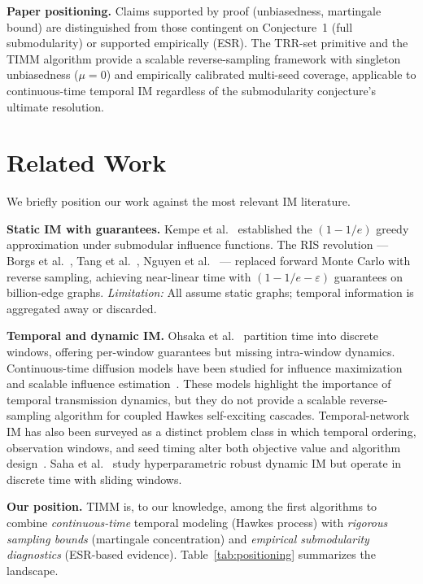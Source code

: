 \documentclass[10pt,conference]{IEEEtran}
\newcommand{\tiimm}{TIMM\xspace}
\begin{document}
\textbf{Paper positioning.}
Claims supported by proof (unbiasedness, martingale bound) are distinguished from those contingent on Conjecture~1 (full submodularity) or supported empirically (ESR).
The TRR-set primitive and the \tiimm{} algorithm provide a scalable reverse-sampling framework with singleton unbiasedness ($\mu{=}0$) and empirically calibrated multi-seed coverage, applicable to continuous-time temporal IM regardless of the submodularity conjecture's ultimate resolution.

\section{Related Work}

We briefly position our work against the most relevant IM literature.

\textbf{Static IM with guarantees.}
Kempe et al.~\cite{kempe2003} established the $(1-1/e)$ greedy approximation under submodular influence functions.
The RIS revolution — Borgs et al.~\cite{borgs2014}, Tang et al.~\cite{tang2014,tang2015}, Nguyen et al.~\cite{nguyen2016} — replaced forward Monte Carlo with reverse sampling, achieving near-linear time with $(1-1/e-\varepsilon)$ guarantees on billion-edge graphs.
\textit{Limitation:} All assume static graphs; temporal information is aggregated away or discarded.

\textbf{Temporal and dynamic IM.}
Ohsaka et al.~\cite{ohsaka2016} partition time into discrete windows, offering per-window guarantees but missing intra-window dynamics.
Continuous-time diffusion models have been studied for influence maximization and scalable influence estimation~\cite{gomez2012,du2013}.
These models highlight the importance of temporal transmission dynamics, but they do not provide a scalable reverse-sampling algorithm for coupled Hawkes self-exciting cascades.
Temporal-network IM has also been surveyed as a distinct problem class in which temporal ordering, observation windows, and seed timing alter both objective value and algorithm design~\cite{yanchenko2024}.
Saha et al.~\cite{saha2025} study hyperparametric robust dynamic IM but operate in discrete time with sliding windows.

\textbf{Our position.}
\tiimm{} is, to our knowledge, among the first algorithms to combine \emph{continuous-time} temporal modeling (Hawkes process) with \emph{rigorous sampling bounds} (martingale concentration) and \emph{empirical submodularity diagnostics} (ESR-based evidence).
Table~\ref{tab:positioning} summarizes the landscape.
\end{document}
